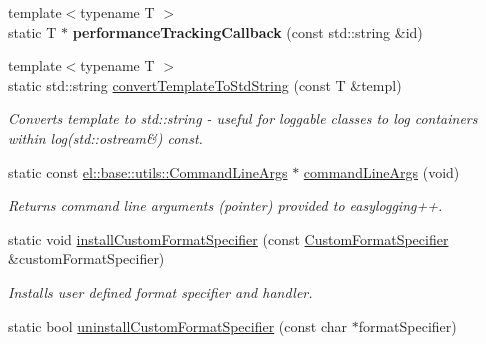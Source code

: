 \begin{DoxyCompactItemize}
\mbox{\label{classel_1_1_helpers_a007844d35095b26301c9218b29d74049}} 
{\footnotesize template$<$typename T $>$ }\\static T $\ast$ {\bfseries performance\+Tracking\+Callback} (const std\+::string \&id)
\item 
\mbox{\label{classel_1_1_helpers_a8b032e32cd042ddc4fef4e814bad1082}} 
{\footnotesize template$<$typename T $>$ }\\static std\+::string \hyperlink{classel_1_1_helpers_a8b032e32cd042ddc4fef4e814bad1082}{convert\+Template\+To\+Std\+String} (const T \&templ)
\begin{DoxyCompactList}\small\item\em Converts template to std\+::string -\/ useful for loggable classes to log containers within log(std\+::ostream\&) const. \end{DoxyCompactList}\item 
\mbox{\label{classel_1_1_helpers_a83bab44f77a4961f8f5231e7ce9917bb}} 
static const \hyperlink{classel_1_1base_1_1utils_1_1_command_line_args}{el\+::base\+::utils\+::\+Command\+Line\+Args} $\ast$ \hyperlink{classel_1_1_helpers_a83bab44f77a4961f8f5231e7ce9917bb}{command\+Line\+Args} (void)
\begin{DoxyCompactList}\small\item\em Returns command line arguments (pointer) provided to easylogging++. \end{DoxyCompactList}\item 
\mbox{\label{classel_1_1_helpers_aa6de15a09db4f2a6763a6652c0ea12b1}} 
static void \hyperlink{classel_1_1_helpers_aa6de15a09db4f2a6763a6652c0ea12b1}{install\+Custom\+Format\+Specifier} (const \hyperlink{classel_1_1_custom_format_specifier}{Custom\+Format\+Specifier} \&custom\+Format\+Specifier)
\begin{DoxyCompactList}\small\item\em Installs user defined format specifier and handler. \end{DoxyCompactList}\item 
\mbox{\label{classel_1_1_helpers_a23ec73819c25758d604d149ad0c6b73f}} 
static bool \hyperlink{classel_1_1_helpers_a23ec73819c25758d604d149ad0c6b73f}{uninstall\+Custom\+Format\+Specifier} (const char $\ast$format\+Specifier)

\end{DoxyCompactItemize}
